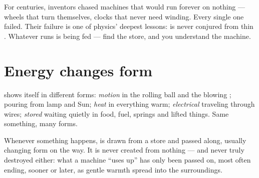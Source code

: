 \begin{remark}\label{rem:g5:everyday-energy:nofree}
For centuries, inventors chased machines that would run forever on
nothing --- wheels that turn themselves, clocks that never need
winding. Every single one failed. Their failure is one of physics'
deepest lessons:  is never conjured from thin . Whatever
runs is being fed --- find the store, and you understand the
machine.
\end{remark}

\section{Energy changes form}

\begin{example}\label{ex:g5:everyday-energy:forms}
 shows itself in different forms: \emph{motion}  in the
rolling ball and the blowing ; \emph{}  pouring from
lamp and Sun; \emph{heat}  in everything warm;
\emph{electrical}  traveling through wires; \emph{stored}
 waiting quietly in food, fuel, springs and lifted things.
Same something, many forms.
\end{example}

\begin{proposition}\label{prop:g5:everyday-energy:chain}
Whenever something happens,  is drawn from a store and passed
along, usually changing form on the way. It is never created
from nothing --- and never truly destroyed either: what a machine
``uses up'' has only been passed on, most often ending, sooner or
later, as gentle warmth spread into the surroundings.
\end{proposition}

